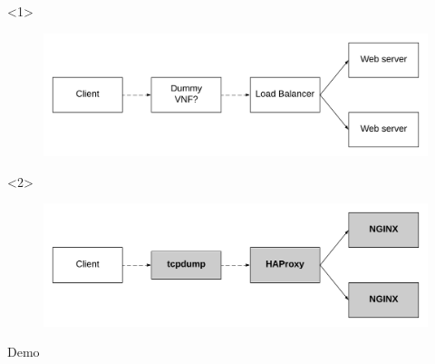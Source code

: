 \documentclass{beamer}
\begin{document}
\begin{frame}
\begin{onlyenv}<1>
	
	\begin{figure}
		\centering
		\includegraphics[width=1\linewidth]{images/3}
		\label{fig:3}
	\end{figure}
	
\end{onlyenv}

\begin{onlyenv}<2>
	
	\begin{figure}
		\centering
		\includegraphics[width=1\linewidth]{images/4}
		\label{fig:2}
	\end{figure}
	
\end{onlyenv}


\end{frame}





\begin{frame}

\Huge{\centerline{Demo}}

\end{frame}

\end{document}
